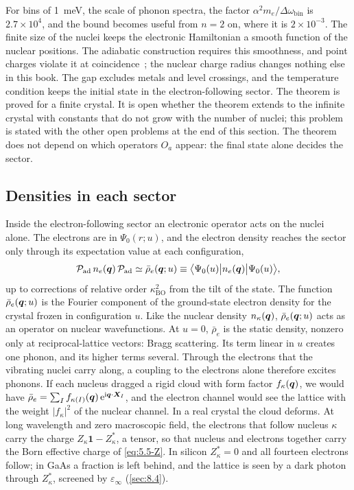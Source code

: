 For bins of \SI{1}{meV}, the scale of phonon spectra, the factor $\alpha^2m_e/\Delta\omega_{\mathrm{bin}}$ is $2.7\times10^4$, and the bound becomes useful from $n = 2$ on, where it is $2\times10^{-3}$. The finite size of the nuclei keeps the electronic Hamiltonian a smooth function of the nuclear positions. The adiabatic construction requires this smoothness, and point charges violate it at coincidence~\cite[Sect.~2]{spohn2001adiabatic}; the nuclear charge radius changes nothing else in this book. The gap excludes metals and level crossings, and the temperature condition keeps the initial state in the electron-following sector. The theorem is proved for a finite crystal. It is open whether the theorem extends to the infinite crystal with constants that do not grow with the number of nuclei; this problem is stated with the other open problems at the end of this section. The theorem does not depend on which operators $O_a$ appear: the final state alone decides the sector.

\subsection{Densities in each sector}

Inside the electron-following sector an electronic operator acts on the nuclei alone. The electrons are in $\Psi_0(r;u)$, and the electron density reaches the sector only through its expectation value at each configuration,
\begin{equation}
  \mathcal{P}_{\mathrm{ad}}\,n_e(\bm{q})\,\mathcal{P}_{\mathrm{ad}} \simeq \bar\rho_e(\bm{q};u) \equiv \bigl\langle\Psi_0(u)\big|n_e(\bm{q})\big|\Psi_0(u)\bigr\rangle ,
  \label{eq:8.6-follow}
\end{equation}
up to corrections of relative order $\kappa_{\mathrm{BO}}^2$ from the tilt of the state. The function $\bar\rho_e(\bm{q};u)$ is the Fourier component of the ground-state electron density for the crystal frozen in configuration $u$. Like the nuclear density $n_\kappa(\bm{q})$, $\bar\rho_e(\bm{q};u)$ acts as an operator on nuclear wavefunctions. At $u = 0$, $\bar\rho_e$ is the static density, nonzero only at reciprocal-lattice vectors: Bragg scattering. Its term linear in $u$ creates one phonon, and its higher terms several. Through the electrons that the vibrating nuclei carry along, a coupling to the electrons alone therefore excites phonons. If each nucleus dragged a rigid cloud with form factor $f_\kappa(\bm{q})$, we would have $\bar\rho_e = \sum_If_{\kappa(I)}(\bm{q})\,\mathrm{e}^{\mathrm{i}\bm{q}\cdot\bm{X}_I}$, and the electron channel would see the lattice with the weight $|f_\kappa|^2$ of the nuclear channel. In a real crystal the cloud deforms. At long wavelength and zero macroscopic field, the electrons that follow nucleus $\kappa$ carry the charge $Z_\kappa\mathbf{1} - Z^*_\kappa$, a tensor, so that nucleus and electrons together carry the Born effective charge of \cref{eq:5.5-Z}. In silicon $Z^*_\kappa = 0$ and all fourteen electrons follow; in GaAs a fraction is left behind, and the lattice is seen by a dark photon through $Z^*_\kappa$, screened by $\varepsilon_\infty$ (\cref{sec:8.4}).

